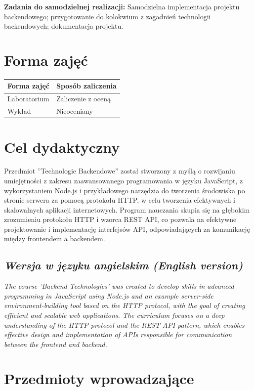 \documentclass[12pt, a4paper]{article}
\begin{document}
\vspace{4pt}
\noindent\textbf{Zadania do samodzielnej realizacji:} Samodzielna implementacja projektu backendowego; przygotowanie do kolokwium z zagadnień technologii backendowych; dokumentacja projektu.

\section{Forma zajęć}

\begin{tabular}{ll}
  \hline
  \textbf{Forma zajęć} & \textbf{Sposób zaliczenia} \\
  \hline
  Laboratorium & Zaliczenie z oceną \\
  Wykład & Nieoceniany \\
  \hline
\end{tabular}

\section{Cel dydaktyczny}

Przedmiot ''Technologie Backendowe'' został stworzony z myślą o rozwijaniu umiejętności z zakresu zaawansowanego programowania w języku JavaScript, z wykorzystaniem Node.js i przykładowego narzędzia do tworzenia środowiska po stronie serwera za pomocą protokołu HTTP, w celu tworzenia efektywnych i skalowalnych aplikacji internetowych. Program nauczania skupia się na głębokim zrozumieniu protokołu HTTP i wzorca REST API, co pozwala na efektywne projektowanie i implementację interfejsów API, odpowiadających za komunikację między frontendem a backendem.

\subsection*{\textit{Wersja w języku angielskim (English version)}}

\textit{The course 'Backend Technologies' was created to develop skills in advanced programming in JavaScript using Node.js and an example server-side environment-building tool based on the HTTP protocol, with the goal of creating efficient and scalable web applications. The curriculum focuses on a deep understanding of the HTTP protocol and the REST API pattern, which enables effective design and implementation of APIs responsible for communication between the frontend and backend.}


\section{Przedmioty wprowadzające}
\end{document}

